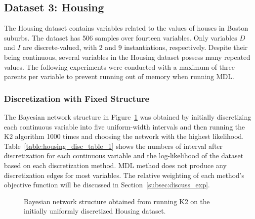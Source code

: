 \subsection{Dataset 3: Housing}
\label{subsec:housing}

The Housing dataset contains variables related to the values of houses in Boston suburbs.
The dataset has \num{506} samples over fourteen variables.
Only variables $D$ and $I$ are discrete-valued, with \num{2} and \num{9} instantiations, respectively.
Despite their being continuous, several variables in the Housing dataset possess many repeated values.
The following experiments were conducted with a maximum of three parents per variable to prevent running out of memory when running MDL.

\subsubsection{Discretization with Fixed Structure}
\label{subsubsec:housing_exp1}

The Bayesian network structure in Figure~\ref{fig:housing_graph_1} was obtained by initially discretizing each continuous variable into five uniform-width intervals and then running the K2 algorithm \num{1000} times and choosing the network with the highest likelihood.
Table~\ref{table:housing_disc_table_1} shows the numbers of interval after discretization for each continuous variable and the log-likelihood of the dataset based on each discretization method.
MDL method does not produce any discretization edges for most variables.
The relative weighting of each method's objective function will be discussed in Section~\ref{subsec:discuss_exp}.


\begin{figure}[ht]
  \centering
  \scalebox{0.8}{}
  \caption{Bayesian network structure obtained from running K2 on the initially uniformly discretized Housing dataset.}
  \label{fig:housing_graph_1}
\end{figure}

